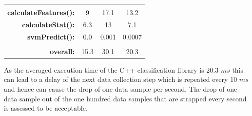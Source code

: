 \begin{center}
\label{table:compmeasurments}
\begin{supertabular}{r|ccc}
        \quad                         & \quad & \quad & \quad  \\[-5pt]
        \textbf{calculateFeatures():} & 9     & 17.1  & 13.2   \\
        \textbf{calculateStat():}     & 6.3   & 13    & 7.1    \\
        \textbf{svmPredict():}        & 0.0   & 0.001 & 0.0007 \\
        \hline
        \quad                         & \quad & \quad & \quad  \\[-5pt]
        \textbf{overall:}             & 15.3 & 30.1 &20.3  \\
\end{supertabular}
\end{center}

As the averaged execution time of the C++ classification library is 20.3 $ms$ this can lead to a delay of the next data collection step which is repeated every 10 $ms$ and hence can cause the drop of one data sample per second. 
The drop of one data sample out of the one hundred data samples that are strapped every second is assessed to be acceptable.
